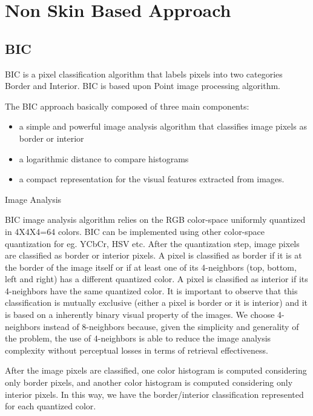 \section {Non Skin Based Approach}


\subsection {BIC}
BIC is a pixel classification algorithm that labels pixels into two categories Border and Interior. BIC is based upon Point image processing algorithm.

The BIC approach basically composed of three main components:
\begin{itemize}
\item a simple and powerful image analysis algorithm that classifies image pixels as border or  interior

\item a logarithmic distance to compare histograms

\item a compact representation for the visual features extracted from images.

\end{itemize}
 

Image Analysis

 

BIC image analysis algorithm relies on the RGB color-space uniformly quantized in 4X4X4=64 colors. BIC can be implemented using other color-space quantization for eg. YCbCr, HSV etc. After the quantization step, image pixels are classified as border or interior pixels. A pixel is classified as border if it is at the border of the image itself or if at least one of its 4-neighbors (top, bottom, left and right) has a different quantized color. A pixel is classified as interior if its 4-neighbors have the same quantized color. It is important to observe that this classification is mutually exclusive (either a pixel is border or it is interior) and it is based on a inherently binary visual property of the images. We choose 4-neighbors instead of 8-neighbors because, given the simplicity and generality of the problem, the use of 4-neighbors is able to reduce the image analysis complexity without perceptual losses in terms of retrieval effectiveness.

After the image pixels are classified, one color histogram is computed considering only border pixels, and another color histogram is computed considering only interior pixels. In this way, we have the border/interior classification represented for each quantized color.

